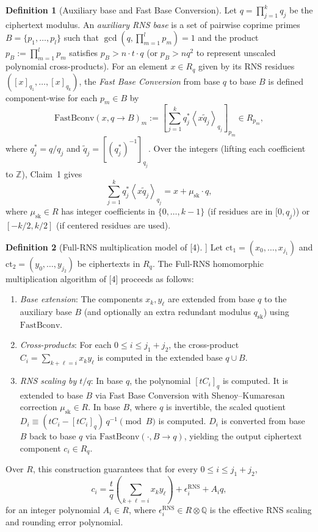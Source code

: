 \documentclass[11pt]{article}
\newcommand{\ct}{\mathrm{ct}}
\newcommand{\qstar}[1]{q^{*}_{#1}}
\newcommand{\qtilde}[1]{\tilde{q}_{#1}}
\newcommand{\musk}{\mu_{\mathrm{sk}}}
\newcommand{\fastbconv}{\mathrm{FastBconv}}
\newcommand{\ur}[2]{\left\langle #1\right\rangle_{#2}}   %
\theoremstyle{plain}
\theoremstyle{definition}
\newtheorem*{definition*}{Definition}
\theoremstyle{remark}
\begin{document}
\begin{definition*}[Auxiliary base and Fast Base Conversion]
Let $q = \prod_{j=1}^k q_j$ be the ciphertext modulus. An \emph{auxiliary RNS base} is a set of
pairwise coprime primes $B = \{p_1,\dots,p_l\}$ such that $\gcd(q, \prod_{m=1}^l p_m) = 1$ and
the product $p_B := \prod_{m=1}^l p_m$ satisfies $p_B > n\cdot t\cdot q$ (or $p_B > nq^2$ to represent
unscaled polynomial cross-products).
For an element $x\in R_q$ given by its RNS residues $([x]_{q_1},\dots,[x]_{q_k})$, the \emph{Fast Base Conversion}
from base $q$ to base $B$ is defined component-wise for each $p_m\in B$ by
\[
 \fastbconv(x, q\to B)_m := \left[ \sum_{j=1}^{k}\qstar{j}\ur{x\qtilde{j}}{q_j} \right]_{p_m} \in R_{p_m},
\]
where $\qstar{j} = q/q_j$ and $\qtilde{j} = [(\qstar{j})^{-1}]_{q_j}$.
Over the integers (lifting each coefficient to $\mathbb{Z}$), Claim~1 gives
\[
 \sum_{j=1}^{k}\qstar{j}\ur{x\qtilde{j}}{q_j} = x + \musk\cdot q ,
\]
where $\musk\in R$ has integer coefficients in $\{0,\dots,k-1\}$ (if residues are in $[0,q_j)$) or
$[-k/2, k/2]$ (if centered residues are used).
\end{definition*}

\begin{definition*}[Full-RNS multiplication model of [4]]
Let $\ct_1 = (x_0,\dots,x_{j_1})$ and $\ct_2 = (y_0,\dots,y_{j_2})$ be ciphertexts in $R_q$.
The Full-RNS homomorphic multiplication algorithm of [4] proceeds as follows:
\begin{enumerate}[leftmargin=2em]
\item \emph{Base extension}: The components $x_k, y_\ell$ are extended from base $q$ to the auxiliary base
      $B$ (and optionally an extra redundant modulus $q_{\mathrm{sk}}$) using $\fastbconv$.
\item \emph{Cross-products}: For each $0\leq i\leq j_1+j_2$, the cross-product
      $C_i = \sum_{k+\ell=i}x_ky_\ell$ is computed in the extended base $q\cup B$.
\item \emph{RNS scaling by $t/q$}:
      In base $q$, the polynomial $[t C_i]_q$ is computed.
      It is extended to base $B$ via Fast Base Conversion with Shenoy--Kumaresan correction
      $\musk\in R$.
      In base $B$, where $q$ is invertible, the scaled quotient
      $D_i \equiv (t C_i - [t C_i]_q)\,q^{-1} \pmod B$ is computed.
      $D_i$ is converted from base $B$ back to base $q$ via $\fastbconv(\cdot, B\to q)$, yielding
      the output ciphertext component $c_i\in R_q$.
\end{enumerate}
Over $R$, this construction guarantees that for every $0\leq i\leq j_1+j_2$,
\[
 c_i = \frac{t}{q}\left(\sum_{k+\ell=i}x_ky_\ell\right) + \epsilon_i^{\mathrm{RNS}} + A_iq ,
\]
for an integer polynomial $A_i\in R$, where $\epsilon_i^{\mathrm{RNS}}\in R\otimes\mathbb{Q}$ is the effective
RNS scaling and rounding error polynomial.
\end{definition*}
\end{document}
